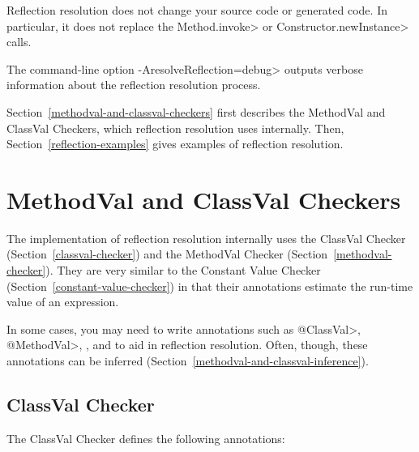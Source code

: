 Reflection resolution does not change your source code or generated code.
In particular, it does not replace the \<Method.invoke> or
\<Constructor.newInstance> calls.

The command-line option \<-AresolveReflection=debug> outputs verbose information about the reflection resolution process.


Section~\ref{methodval-and-classval-checkers} first describes the MethodVal
and ClassVal Checkers, which reflection resolution uses internally.  Then,
Section~\ref{reflection-examples} gives examples of reflection resolution.


\section{MethodVal and ClassVal Checkers\label{methodval-and-classval-checkers}}

The implementation of reflection resolution internally uses the ClassVal
Checker (Section~\ref{classval-checker}) and the MethodVal Checker
(Section~\ref{methodval-checker}).  They are very similar to the Constant
Value Checker (Section~\ref{constant-value-checker}) in that their
annotations estimate the run-time value of an expression.

In some cases, you may need to write annotations such as \<@ClassVal>,
\<@MethodVal>, , and  to aid in reflection resolution.
Often, though, these annotations can be inferred
(Section~\ref{methodval-and-classval-inference}).


\subsection{ClassVal Checker\label{classval-checker}}

The ClassVal Checker defines the following annotations:

